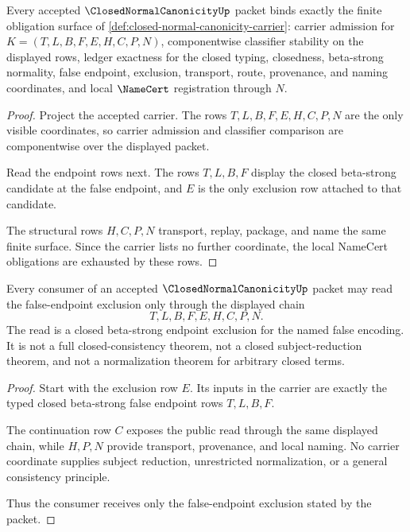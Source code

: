 \begin{theorem}
\label{thm:closed-normal-canonicity-namecert-obligations}
Every accepted $\ClosedNormalCanonicityUp$ packet binds exactly the finite obligation surface of \autoref{def:closed-normal-canonicity-carrier}: carrier admission for $K=(T,L,B,F,E,H,C,P,N)$, componentwise classifier stability on the displayed rows, ledger exactness for the closed typing, closedness, beta-strong normality, false endpoint, exclusion, transport, route, provenance, and naming coordinates, and local $\NameCert$ registration through $N$.
\end{theorem}
\begin{proof}
Project the accepted carrier. The rows $T,L,B,F,E,H,C,P,N$ are the only visible coordinates, so carrier admission and classifier comparison are componentwise over the displayed packet.

Read the endpoint rows next. The rows $T,L,B,F$ display the closed beta-strong candidate at the false endpoint, and $E$ is the only exclusion row attached to that candidate.

The structural rows $H,C,P,N$ transport, replay, package, and name the same finite surface. Since the carrier lists no further coordinate, the local NameCert obligations are exhausted by these rows.
\end{proof}

\begin{theorem}
\label{thm:closed-normal-canonicity-false-endpoint-exclusion}
Every consumer of an accepted $\ClosedNormalCanonicityUp$ packet may read the false-endpoint exclusion only through the displayed chain
$$
T,L,B,F,E,H,C,P,N.
$$
The read is a closed beta-strong endpoint exclusion for the named false encoding. It is not a full closed-consistency theorem, not a closed subject-reduction theorem, and not a normalization theorem for arbitrary closed terms.
\end{theorem}
\begin{proof}
Start with the exclusion row $E$. Its inputs in the carrier are exactly the typed closed beta-strong false endpoint rows $T,L,B,F$.

The continuation row $C$ exposes the public read through the same displayed chain, while $H,P,N$ provide transport, provenance, and local naming. No carrier coordinate supplies subject reduction, unrestricted normalization, or a general consistency principle.

Thus the consumer receives only the false-endpoint exclusion stated by the packet.
\end{proof}

